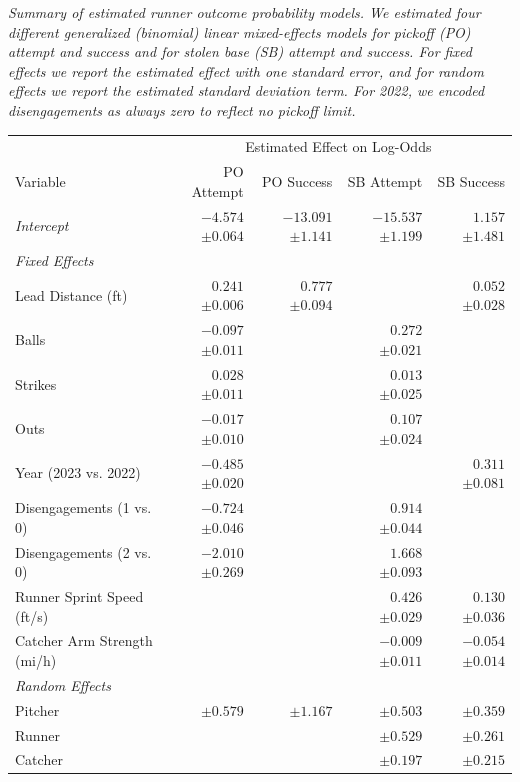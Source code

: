 \documentclass[opre,dblanonrev]{informs4}
\begin{document}
      \begin{table}
        \TABLE
        {\it Summary of estimated runner outcome probability models. We estimated four different generalized (binomial) linear mixed-effects models for pickoff (PO) attempt and success and for stolen base (SB) attempt and success. For fixed effects we report the estimated effect with one standard error, and for random effects we report the estimated standard deviation term. For 2022, we encoded disengagements as always zero to reflect no pickoff limit.
        \label{tab:model-summary}}
        {\begin{tabular}{l|rrrr}
    &\multicolumn{4}{c}{Estimated Effect on Log-Odds}\\
    Variable & PO Attempt & PO Success & SB Attempt & SB Success \\
      \hline
    {\it Intercept} & $-4.574$ $\pm0.064$ & $-13.091$ $\pm1.141$ & $-15.537$ $\pm1.199$ & $1.157$ $\pm1.481$ \\ 
       \hline
    {\it Fixed Effects} &  &  &  &  \\ 
      Lead Distance (ft) & $0.241$ $\pm0.006$ & $0.777$ $\pm0.094$ &  & $0.052$ $\pm0.028$ \\ 
      Balls & $-0.097$ $\pm0.011$ &  & $0.272$ $\pm0.021$ &  \\ 
      Strikes & $0.028$ $\pm0.011$ &  & $0.013$ $\pm0.025$ &  \\ 
      Outs & $-0.017$ $\pm0.010$ &  & $0.107$ $\pm0.024$ &  \\ 
      Year (2023 vs. 2022) & $-0.485$ $\pm0.020$ &  &  & $0.311$ $\pm0.081$ \\ 
      Disengagements (1 vs. 0) & $-0.724$ $\pm0.046$ &  & $0.914$ $\pm0.044$ &  \\ 
      Disengagements (2 vs. 0) & $-2.010$ $\pm0.269$ &  & $1.668$ $\pm0.093$ &  \\ 
      Runner Sprint Speed (ft/s) &  &  & $0.426$ $\pm0.029$ & $0.130$ $\pm0.036$ \\ 
      Catcher Arm Strength (mi/h) &  &  & $-0.009$ $\pm0.011$ & $-0.054$ $\pm0.014$ \\ 
       \hline
    {\it Random Effects} &  &  &  &  \\ 
      Pitcher &  $\pm0.579$ &  $\pm1.167$ &  $\pm0.503$ &  $\pm0.359$ \\ 
      Runner &  &  &  $\pm0.529$ &  $\pm0.261$ \\ 
      Catcher &  &  &  $\pm0.197$ &  $\pm0.215$ \\ 
    \end{tabular}}
    {}
       \end{table}
      
\end{document}

